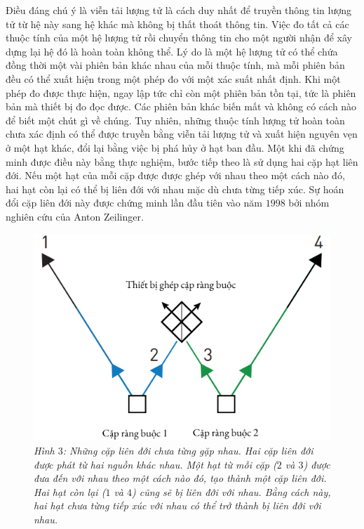 \begin{multicols}{2}
	\vskip 0.1cm
	Điều đáng chú ý là viễn tải lượng tử là cách duy nhất để truyền thông tin lượng tử từ hệ này sang hệ khác mà không bị thất thoát thông tin. Việc đo tất cả các thuộc tính của một hệ lượng tử rồi chuyển thông tin cho một người nhận để xây dựng lại hệ đó là hoàn toàn không thể. Lý do là một hệ lượng tử có thể chứa đồng thời một vài phiên bản khác nhau của mỗi thuộc tính, mà mỗi phiên bản đều có thể xuất hiện trong một phép đo với một xác suất nhất định. Khi một phép đo được thực hiện, ngay lập tức chỉ còn một phiên bản tồn tại, tức là phiên bản mà thiết bị đo đọc được. Các phiên bản khác biến mất và không có cách nào để biết một chút gì về chúng. Tuy nhiên, những thuộc tính lượng tử hoàn toàn chưa xác định có thể được truyền bằng viễn tải lượng tử và xuất hiện nguyên vẹn ở một hạt khác, đổi lại bằng việc bị phá hủy ở hạt ban đầu.
	\vskip 0.1cm
	Một khi đã chứng minh được điều này bằng thực nghiệm, bước tiếp theo là sử dụng hai cặp hạt liên đới. Nếu một hạt của mỗi cặp được được ghép với nhau theo một cách nào đó, hai hạt còn lại có thể bị liên đới với nhau mặc dù chưa từng tiếp xúc. Sự hoán đổi cặp liên đới này được chứng minh lần đầu tiên vào năm $1998$ bởi nhóm nghiên cứu của Anton Zeilinger.
	\begin{figure}[H]
		\vspace*{-5pt}
		\centering
		\captionsetup{labelformat= empty, justification=centering}
		\includegraphics[width= 1\linewidth]{3}
		\caption{\small\textit{\color{timhieukhoahoc}Hình $3$: Những cặp liên đới chưa từng gặp nhau. Hai cặp liên đới được phát từ hai nguồn khác nhau. Một hạt từ mỗi cặp ($2$ và $3$) được đưa đến với nhau theo một cách nào đó, tạo thành một cặp liên đới. Hai hạt còn lại ($1$ và $4$) cũng sẽ bị liên đới với nhau. Bằng cách này, hai hạt chưa từng tiếp xúc với nhau có thể trở thành bị liên đới với nhau.}}

\end{figure}
\end{multicols}
